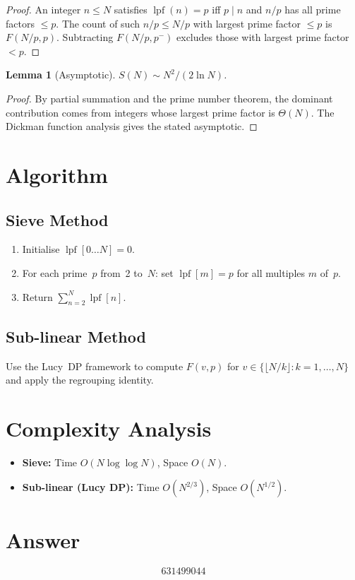 \documentclass[11pt]{article}
\newtheorem{lemma}[theorem]{Lemma}
\begin{document}
\begin{proof}
An integer $n\le N$ satisfies $\operatorname{lpf}(n)=p$ iff $p\mid n$ and $n/p$ has all prime factors $\le p$. The count of such $n/p\le N/p$ with largest prime factor $\le p$ is $F(N/p,p)$. Subtracting $F(N/p,p^{-})$ excludes those with largest prime factor $<p$.
\end{proof}

\begin{lemma}[Asymptotic]
$S(N)\sim N^2/(2\ln N)$.
\end{lemma}

\begin{proof}
By partial summation and the prime number theorem, the dominant contribution comes from integers whose largest prime factor is $\Theta(N)$. The Dickman function analysis gives the stated asymptotic.
\end{proof}

\section{Algorithm}

\subsection{Sieve Method}
\begin{enumerate}
\item Initialise $\operatorname{lpf}[0\ldots N]=0$.
\item For each prime~$p$ from~2 to~$N$: set $\operatorname{lpf}[m]=p$ for all multiples $m$ of~$p$.
\item Return $\sum_{n=2}^{N}\operatorname{lpf}[n]$.
\end{enumerate}

\subsection{Sub-linear Method}
Use the Lucy~DP framework to compute $F(v,p)$ for $v\in\{\lfloor N/k\rfloor:k=1,\ldots,N\}$ and apply the regrouping identity.

\section{Complexity Analysis}

\begin{itemize}
\item \textbf{Sieve:} Time $O(N\log\log N)$, Space $O(N)$.
\item \textbf{Sub-linear (Lucy DP):} Time $O(N^{2/3})$, Space $O(N^{1/2})$.
\end{itemize}

\section{Answer}

\[
\boxed{631499044}
\]
\end{document}
